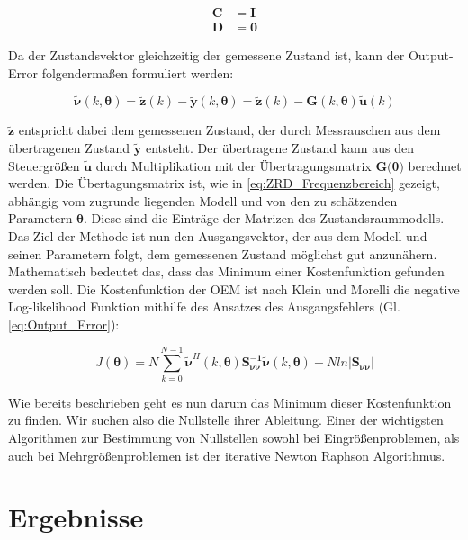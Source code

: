 \begin{align}
	\mathbf{C} &= \mathbf{I} \nonumber \\
 	\mathbf{D} &= \mathbf{0}          
	\label{eq:CD}
\end{align}

Da der Zustandsvektor gleichzeitig der gemessene Zustand ist, kann der Output-Error folgendermaßen formuliert werden:

\begin{equation}
    \mathbf{\tilde{\nu}}(k,\mathbf{\theta}) = \mathbf{\tilde{z}}(k)-\mathbf{\tilde{y}}(k,\mathbf{\theta}) = \mathbf{\tilde{z}}(k)-\mathbf{G}(k,\mathbf{\theta})\mathbf{\tilde{u}}(k)  
	\label{eq:Output_Error}
\end{equation}

$\mathbf{\tilde{z}}$ entspricht dabei dem gemessenen Zustand, der durch Messrauschen aus dem übertragenen Zustand 
$\mathbf{\tilde{y}}$ entsteht. Der übertragene Zustand kann aus den Steuergrößen $\mathbf{\tilde{u}}$ durch Multiplikation 
mit der Übertragungsmatrix $\mathbf{G}(\mathbf{\theta)}$ berechnet werden. Die Übertagungsmatrix ist, wie in 
\cref{eq:ZRD_Frequenzbereich} gezeigt, abhängig vom zugrunde liegenden Modell und von den zu schätzenden Parametern 
$\mathbf{\theta}$. Diese sind die Einträge der Matrizen des Zustandsraummodells. Das Ziel der Methode ist nun den Ausgangsvektor, der aus dem Modell und seinen Parametern folgt, dem gemessenen Zustand möglichst gut anzunähern. Mathematisch bedeutet das, dass das Minimum einer Kostenfunktion gefunden werden soll. Die Kostenfunktion der OEM ist nach Klein und Morelli \cite{Klein2006} die negative Log-likelihood Funktion mithilfe des Ansatzes des Ausgangsfehlers (Gl. \ref{eq:Output_Error}):

 \begin{equation}
    J(\mathbf{\theta})=N \sum\limits_{k=0}^{N-1}\mathbf{\tilde{\nu}}^H(k,\mathbf{\theta})\mathbf{S_{\nu\nu}^{-1}}\mathbf{\tilde{\nu}}(k,\mathbf{\theta})+Nln|\mathbf{S_{\nu\nu}}|
	\label{eq:Kostenfunktion}
\end{equation}  

Wie bereits beschrieben geht es nun darum das Minimum dieser Kostenfunktion zu finden. Wir suchen also die Nullstelle ihrer Ableitung. Einer der wichtigsten Algorithmen zur Bestimmung von Nullstellen sowohl bei Eingrößenproblemen, als auch bei Mehrgrößenproblemen ist der iterative Newton Raphson Algorithmus.

\section{Ergebnisse}